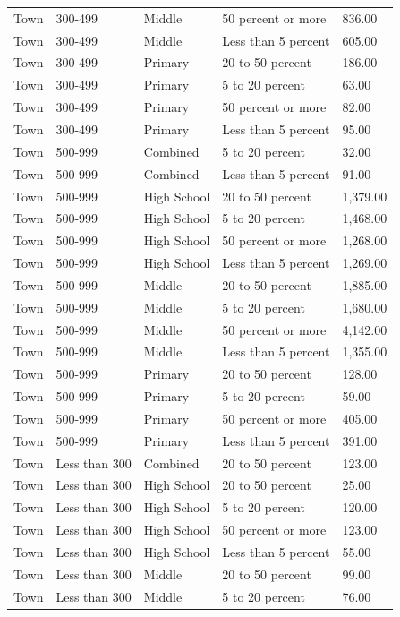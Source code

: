 \documentclass[
  man, fleqn, noextraspace]{apa6}
\begin{document}
\begin{table}[tbp]
\begin{center}
\begin{threeparttable}
\begin{tabular}{lllll}
Town & 300-499 & Middle & 50 percent or more & 836.00\\
Town & 300-499 & Middle & Less than 5 percent & 605.00\\
Town & 300-499 & Primary & 20 to 50 percent & 186.00\\
Town & 300-499 & Primary & 5 to 20 percent & 63.00\\
Town & 300-499 & Primary & 50 percent or more & 82.00\\
Town & 300-499 & Primary & Less than 5 percent & 95.00\\
Town & 500-999 & Combined & 5 to 20 percent & 32.00\\
Town & 500-999 & Combined & Less than 5 percent & 91.00\\
Town & 500-999 & High School & 20 to 50 percent & 1,379.00\\
Town & 500-999 & High School & 5 to 20 percent & 1,468.00\\
Town & 500-999 & High School & 50 percent or more & 1,268.00\\
Town & 500-999 & High School & Less than 5 percent & 1,269.00\\
Town & 500-999 & Middle & 20 to 50 percent & 1,885.00\\
Town & 500-999 & Middle & 5 to 20 percent & 1,680.00\\
Town & 500-999 & Middle & 50 percent or more & 4,142.00\\
Town & 500-999 & Middle & Less than 5 percent & 1,355.00\\
Town & 500-999 & Primary & 20 to 50 percent & 128.00\\
Town & 500-999 & Primary & 5 to 20 percent & 59.00\\
Town & 500-999 & Primary & 50 percent or more & 405.00\\
Town & 500-999 & Primary & Less than 5 percent & 391.00\\
Town & Less than 300 & Combined & 20 to 50 percent & 123.00\\
Town & Less than 300 & High School & 20 to 50 percent & 25.00\\
Town & Less than 300 & High School & 5 to 20 percent & 120.00\\
Town & Less than 300 & High School & 50 percent or more & 123.00\\
Town & Less than 300 & High School & Less than 5 percent & 55.00\\
Town & Less than 300 & Middle & 20 to 50 percent & 99.00\\
Town & Less than 300 & Middle & 5 to 20 percent & 76.00\\

\end{tabular}
\end{threeparttable}
\end{center}
\end{table}
\end{document}
